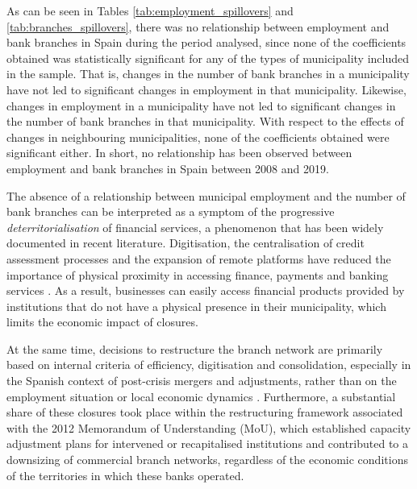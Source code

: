 \documentclass[a4paper,11pt,oneside]{article}
\begin{document}
As can be seen in Tables \ref{tab:employment_spillovers} and \ref{tab:branches_spillovers}, there was no relationship between employment and bank branches in Spain during the period analysed, since none of the coefficients obtained was statistically significant for any of the types of municipality included in the sample. That is, changes in the number of bank branches in a municipality have not led to significant changes in employment in that municipality. Likewise, changes in employment in a municipality have not led to significant changes in the number of bank branches in that municipality. With respect to the effects of changes in neighbouring municipalities, none of the coefficients obtained were significant either. In short, no relationship has been observed between employment and bank branches in Spain between 2008 and 2019.

The absence of a relationship between municipal employment and the number of bank branches can be interpreted as a symptom of the progressive \textit{deterritorialisation} of financial services, a phenomenon that has been widely documented in recent literature. Digitisation, the centralisation of credit assessment processes and the expansion of remote platforms have reduced the importance of physical proximity in accessing finance, payments and banking services \citep{petersen2002does,deyoung2007internet,alessandrini2009banks}. As a result, businesses can easily access financial products provided by institutions that do not have a physical presence in their municipality, which limits the economic impact of closures.



At the same time, decisions to restructure the branch network are primarily based on internal criteria of efficiency, digitisation and consolidation, especially in the Spanish context of post-crisis mergers and adjustments, rather than on the employment situation or local economic dynamics \citep{jimenez2018cierre,de2025accesibilidad}. Furthermore, a substantial share of these closures took place within the restructuring framework associated with the 2012 Memorandum of Understanding (MoU), which established capacity adjustment plans for intervened or recapitalised institutions and contributed to a downsizing of commercial branch networks, regardless of the economic conditions of the territories in which these banks operated.



\end{document}
